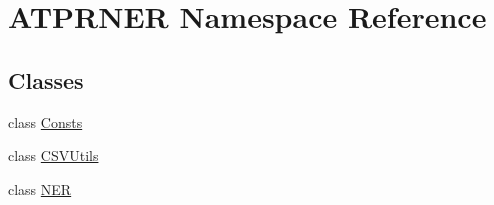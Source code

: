 \hypertarget{namespace_a_t_p_r_n_e_r}{}\section{A\+T\+P\+R\+N\+ER Namespace Reference}
\label{namespace_a_t_p_r_n_e_r}
\subsection*{Classes}
\begin{DoxyCompactItemize}
\item 
class \hyperlink{class_a_t_p_r_n_e_r_1_1_consts}{Consts}
\item 
class \hyperlink{class_a_t_p_r_n_e_r_1_1_c_s_v_utils}{C\+S\+V\+Utils}
\item 
class \hyperlink{class_a_t_p_r_n_e_r_1_1_n_e_r}{N\+ER}
\end{DoxyCompactItemize}
